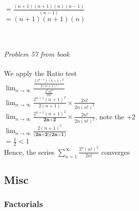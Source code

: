 \documentclass{article}
\begin{document}
        $= \frac{(n+1)(n+1)(n)(n-1)}{(n-1)}$\\[15pt]

        $= {(n+1)(n+1)(n)}$\\[15pt]
\pagebreak
        \endgroup

        \begingroup 
        \centering
        \\
        \hrulefill \\[10pt]

        \textit{Problem 57 from book}\\ [15pt]
        
         \\ [10pt]
        We apply the Ratio test \\ [15pt]

        $\displaystyle \lim_{n \rightarrow \infty} \frac{\frac{(2^{n+1})(n+1)!^2}{2(n+1)!}}{\frac{2^nn!^2}{2n!}}$\\ [10pt]

        $\displaystyle \lim_{n \rightarrow \infty} \frac{2^{n+1}(n+1)^2}{2(n+1)} \times \frac{2n!}{2n(n!)^2}$\\[10pt]

        $\displaystyle \lim_{n \rightarrow \infty} \frac{2^{n+1}(n+1)^2}{\textbf{2n+2}}\times \frac{2n!}{2n(n!)^2}$,      {\tiny note the +2}\\[10pt]

        $\displaystyle \lim_{n \rightarrow \infty} \frac{2(n+1)^2}{\textbf{(2n+2)(2n+1)}}$ \\ [10pt]
        $= \frac{1}{2} < 1$\\ [15pt]
        Hence, the series $\displaystyle \sum_{n=1}^{\infty} \frac{2^n(n!)^2}{2n!}$ converges\\

        \endgroup
    \pagebreak



\subsection{\centering \huge Misc}
    \centering
    \subsubsection{\huge Factorials}

        \hrulefill \\[10pt]
\end{document}
